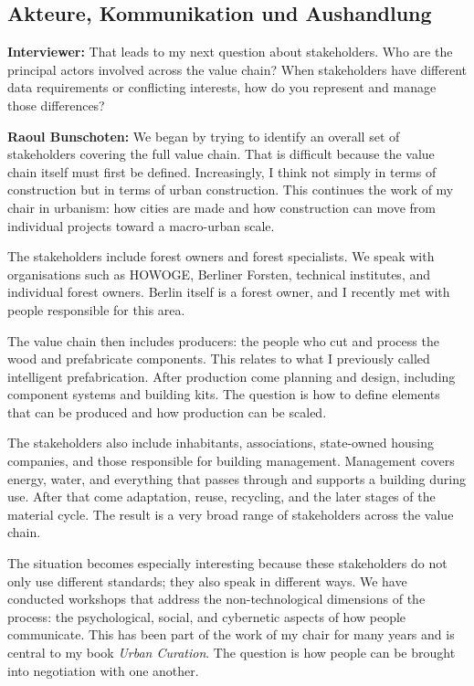 \subsection{Akteure, Kommunikation und Aushandlung}

\textbf{Interviewer:} That leads to my next question about stakeholders. Who are the principal actors involved across the value chain? When stakeholders have different data requirements or conflicting interests, how do you represent and manage those differences?

\textbf{Raoul Bunschoten:} We began by trying to identify an overall set of stakeholders covering the full value chain. That is difficult because the value chain itself must first be defined. Increasingly, I think not simply in terms of construction but in terms of urban construction. This continues the work of my chair in urbanism: how cities are made and how construction can move from individual projects toward a macro-urban scale.

The stakeholders include forest owners and forest specialists. We speak with organisations such as HOWOGE, Berliner Forsten, technical institutes, and individual forest owners. Berlin itself is a forest owner, and I recently met with people responsible for this area.

The value chain then includes producers: the people who cut and process the wood and prefabricate components. This relates to what I previously called intelligent prefabrication. After production come planning and design, including component systems and building kits. The question is how to define elements that can be produced and how production can be scaled.

The stakeholders also include inhabitants, associations, state-owned housing companies, and those responsible for building management. Management covers energy, water, and everything that passes through and supports a building during use. After that come adaptation, reuse, recycling, and the later stages of the material cycle. The result is a very broad range of stakeholders across the value chain.

The situation becomes especially interesting because these stakeholders do not only use different standards; they also speak in different ways. We have conducted workshops that address the non-technological dimensions of the process: the psychological, social, and cybernetic aspects of how people communicate. This has been part of the work of my chair for many years and is central to my book \textit{Urban Curation}. The question is how people can be brought into negotiation with one another.

